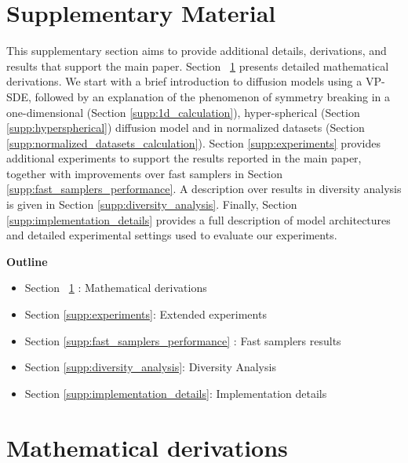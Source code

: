  
\section*{Supplementary Material}
 

\appendix

This supplementary section aims to provide additional details, derivations, and results that support the main paper. Section ~\ref{supp:mathematical_derivations} presents detailed mathematical derivations. We start with a brief introduction to diffusion models using a VP-SDE, followed by an explanation of the phenomenon of symmetry breaking in a one-dimensional (Section \ref{supp:1d_calculation}), hyper-spherical (Section \ref{supp:hyperspherical}) diffusion model and in normalized datasets (Section \ref{supp:normalized_datasets_calculation}). Section \ref{supp:experiments} provides additional experiments to support the results reported in the main paper, together with improvements over fast samplers in Section \ref{supp:fast_samplers_performance}. A  description over results in diversity analysis is given in Section \ref{supp:diversity_analysis}. Finally, Section \ref{supp:implementation_details}  provides a full description of model architectures and detailed experimental settings used to evaluate our experiments.

\textbf{Outline}

\begin{itemize}
    \item Section ~\ref{supp:mathematical_derivations} : Mathematical derivations
    \item Section \ref{supp:experiments}: Extended experiments
    \item Section \ref{supp:fast_samplers_performance} : Fast samplers results
    \item Section \ref{supp:diversity_analysis}: Diversity Analysis
    \item Section \ref{supp:implementation_details}: Implementation details
\end{itemize}




\section{Mathematical derivations}
\label{supp:mathematical_derivations}

